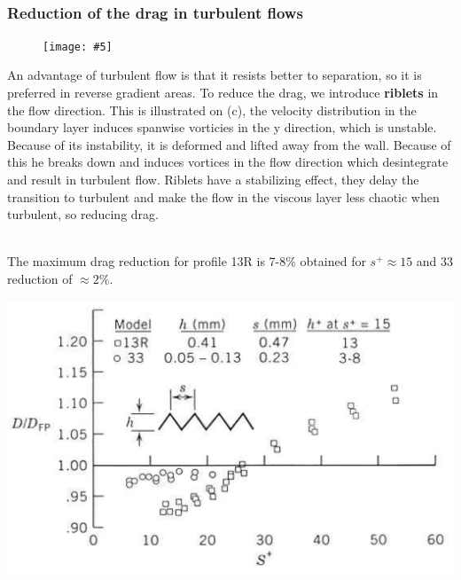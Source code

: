 \documentclass[british,french,11pt, a4paper, openany]{article}
\newcommand{\wrapfig}[6]{%
	\begin{figure}%
		\vspace{-5mm}%
		\texttt{[image: \#5]}%
		\captionof{figure}{}%
		\label{#6}%
	\end{figure}%
}
\begin{document}
\ \\[5cm]
\subsubsection{Reduction of the drag in turbulent flows}
\wrapfig{14}{l}{4}{0.15}{ch4/6}{ch4/6}
An advantage of turbulent flow is that it resists better to separation, so it is preferred in reverse gradient areas. To reduce the drag, we introduce \textbf{riblets} in the flow direction.  This is illustrated on (c), the velocity distribution in the boundary layer induces spanwise vorticies in the y direction, which is unstable. Because of its instability, it is deformed and lifted away from the wall. Because of this he breaks down and induces vortices in the flow direction which desintegrate and result in turbulent flow. Riblets have a stabilizing effect, they delay the transition to turbulent and make the flow in the viscous layer less chaotic when turbulent, so reducing drag.  

\ \\ 

The maximum drag reduction for profile 13R is 7-8\% obtained for $s^+ \approx 15$ and 33 reduction of $\approx 2\%$. 
\\

\begin{center}
	\includegraphics[scale=0.2]{ch4/7}
\end{center}

\end{document}
